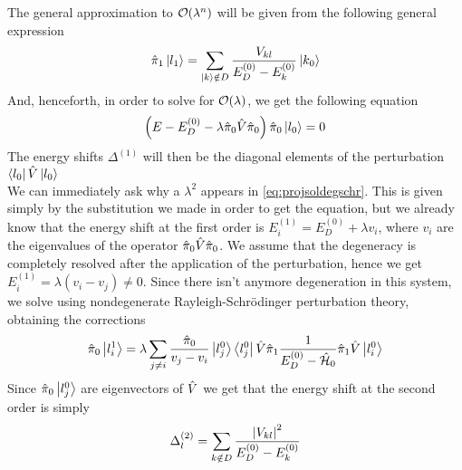 \documentclass[../qm.tex]{subfiles}
\begin{document}
	The general approximation to $\order{\lambda^n}$ will be given from the following general expression
	\begin{equation*}
		\hat{\pi}_1\ket{l_1}=\sum_{\ket{k}\notin D}\frac{V_{kl}}{E_D^{(0)}-E_k^{(0)}}\ket{k_0}
	\end{equation*}
	And, henceforth, in order to solve for $\order{\lambda}$, we get the following equation
	\begin{equation}
		\left( E-E_D^{(0)}-\lambda\hat{\pi}_0\hat{V}\hat{\pi}_0 \right)\hat{\pi}_0\ket{l_0}=0
		\label{eq:firstorderdegenerate}
	\end{equation}
	The energy shifts $\Delta^{(1)}$ will then be the diagonal elements of the perturbation $\bra{l_0}\hat{V}\ket{l_0}$\\
	We can immediately ask why a $\lambda^2$ appears in \eqref{eq:projsoldegschr}. This is given simply by the substitution we made in order to get the equation, but we already know that the energy shift at the first order is $E_i^{(1)}=E_D^{(0)}+\lambda v_i$, where $v_i$ are the eigenvalues of the operator $\hat{\pi}_0\hat{V}\hat{\pi}_0$. We assume that the degeneracy is completely resolved after the application of the perturbation, hence we get $E_i^{(1)}=\lambda(v_i-v_j)\ne0$. Since there isn't anymore degeneration in this system, we solve using nondegenerate Rayleigh-Schrödinger perturbation theory, obtaining the corrections
	\begin{equation}
		\hat{\pi}_0\ket{l^1_i}=\lambda\sum_{j\ne i}\frac{\hat{\pi}_0}{v_j-v_i}\ket{l_j^0}\bra{l_j^0}\hat{V}\hat{\pi}_1\frac{1}{E_D^{(0)}-\hat{\mathcal{H}}_0}\hat{\pi}_1\hat{V}\ket{l_i^0}
		\label{eq:correctionsdegeigenkets}
	\end{equation}
	Since $\hat{\pi}_0\ket{l_j^0}$ are eigenvectors of $\hat{V}$ we get that the energy shift at the second order is simply
	\begin{equation}
		\Delta_l^{(2)}=\sum_{k\notin D}\frac{\abs{V_{kl}}^2}{E_D^{(0)}-E_k^{(0)}}
		\label{eq:deg2ordshift}
	\end{equation}
\end{document}
